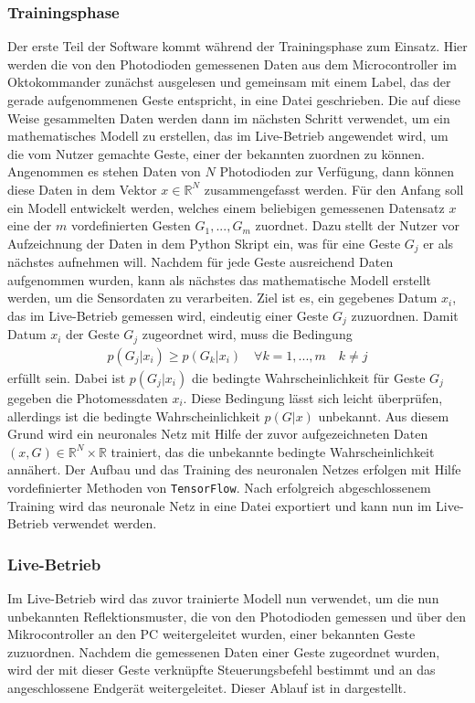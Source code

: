 \subsubsection*{Trainingsphase}
Der erste Teil der Software kommt während der Trainingsphase zum Einsatz. Hier werden die von den Photodioden gemessenen Daten aus dem Microcontroller im Oktokommander zunächst ausgelesen und gemeinsam mit einem Label, das der gerade aufgenommenen Geste entspricht, in eine Datei geschrieben. Die auf diese Weise gesammelten Daten werden dann im nächsten Schritt verwendet, um ein mathematisches Modell zu erstellen, das im Live-Betrieb angewendet wird, um die vom Nutzer gemachte Geste, einer der bekannten zuordnen zu können. Angenommen es stehen Daten von $N$ Photodioden zur Verfügung, dann können diese Daten in dem Vektor $x\in \mathbb{R}^N$ zusammengefasst werden. Für den Anfang soll ein Modell entwickelt werden, welches einem beliebigen gemessenen Datensatz $x$ eine der $m$ vordefinierten Gesten $G_1 , ... , G_m$ zuordnet. Dazu stellt der Nutzer vor Aufzeichnung der Daten in dem Python Skript ein, was für eine Geste $G_j$ er als nächstes aufnehmen will. Nachdem für jede Geste ausreichend Daten aufgenommen wurden, kann als nächstes das mathematische Modell erstellt werden, um die Sensordaten zu verarbeiten. Ziel ist es, ein gegebenes Datum $x_i$, das im Live-Betrieb gemessen wird, eindeutig einer Geste $G_j$ zuzuordnen. Damit Datum $x_i$ der Geste $G_j$ zugeordnet wird, muss die Bedingung 
\begin{align*}
	p(G_j | x_i) \geq p(G_k | x_i) \quad \forall k = 1,...,m \quad k \neq j
\end{align*}
erfüllt sein. Dabei ist $p(G_j | x_i)$ die bedingte Wahrscheinlichkeit für Geste $G_j$ gegeben die Photomessdaten $x_i$. Diese Bedingung lässt sich leicht überprüfen, allerdings ist die bedingte Wahrscheinlichkeit $p(G | x)$ unbekannt. Aus diesem Grund wird ein neuronales Netz mit Hilfe der zuvor aufgezeichneten Daten $(x,G) \in \mathbb{R}^N \times \mathbb{R}$ trainiert, das die unbekannte bedingte Wahrscheinlichkeit annähert. Der Aufbau und das Training des neuronalen Netzes erfolgen mit Hilfe vordefinierter Methoden von \texttt{TensorFlow}\texttrademark. Nach erfolgreich abgeschlossenem Training wird das neuronale Netz in eine Datei exportiert und kann nun im Live-Betrieb verwendet werden.

\subsubsection*{Live-Betrieb}
Im Live-Betrieb wird das zuvor trainierte Modell nun verwendet, um die nun unbekannten Reflektionsmuster, die von den Photodioden gemessen und über den Mikrocontroller an den PC weitergeleitet wurden, einer bekannten Geste zuzuordnen. Nachdem die gemessenen Daten einer Geste zugeordnet wurden, wird der mit dieser Geste verknüpfte Steuerungsbefehl bestimmt und an das angeschlossene Endgerät weitergeleitet. Dieser Ablauf ist in  dargestellt.

